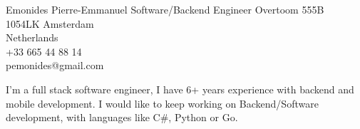\documentclass{emonides-cv}
\begin{document}
  
  {Emonides} {Pierre-Emmanuel}
  {Software/Backend Engineer}
  { Overtoom 555B\\
    1054LK Amsterdam\\
    Netherlands\\
    +33 665 44 88 14\\
    pemonides@gmail.com\\
    }

I'm a full stack software engineer, I have 6+ years experience with backend and mobile development.
I would like to keep working on Backend/Software development, with languages like C\#, Python or Go.
\end{document}
